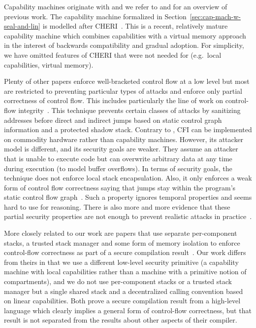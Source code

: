 \documentclass{jfp}
\begin{document}
Capability machines originate with \citet{dennis_programming_1966} and we refer to \citet{levy_capability-based_1984} and \citet{watson_cheri_2015} for an overview of previous work.
The capability machine formalized in Section~\ref{sec:cap-mach-w-seal-and-lin} is modelled after CHERI~\citep{watson_cheri_2015,woodruff_cheri_2014}.
This is a recent, relatively mature capability machine which combines capabilities with a virtual memory approach in the interest of backwards compatibility and gradual adoption.
For simplicity, we have omitted features of CHERI that were not needed for \stktokens{} (e.g.\ local capabilities, virtual memory).

Plenty of other papers enforce well-bracketed control flow at a low level but most are restricted to preventing particular types of attacks and enforce only partial correctness of control flow.
This includes particularly the line of work on control-flow integrity~\citep{abadi_control-flow_2005}.
This technique prevents certain classes of attacks by sanitizing addresses before direct and indirect jumps based on static control graph information and a protected shadow stack.
Contrary to \stktokens{}, CFI can be implemented on commodity hardware rather than capability machines.
However, its attacker model is different, and its security goals are weaker.
They assume an attacker that is unable to execute code but can overwrite arbitrary data at any time during execution (to model buffer overflows).
In terms of security goals, the technique does not enforce local stack encapsulation.
Also, it only enforces a weak form of control flow correctness saying that jumps stay within the program's static control flow graph~\cite{Abadi2005Theory}.
Such a property ignores temporal properties and seems hard to use for reasoning.
There is also more and more evidence that these partial security properties are not enough to prevent realistic attacks in practice~\citep{Evans:2015:CJW:2810103.2813646,Carlini2015ControlFlowBending,van_der_veen_dynamics_2017}.

More closely related to our work are papers that use separate per-component stacks, a trusted stack manager and some form of memory isolation to enforce control-flow correctness as part of a secure compilation result~\citep{patrignani_modular_2016,juglaret_beyond_2016}.
Our work differs from theirs in that we use a different low-level security primitive (a capability machine with local capabilities rather than a machine with a primitive notion of compartments), and we do not use per-component stacks or a trusted stack manager but a single shared stack and a decentralized calling convention based on linear capabilities.
Both prove a secure compilation result from a high-level language which clearly implies a general form of control-flow correctness, but that result is not separated from the results about other aspects of their compiler.
\end{document}

